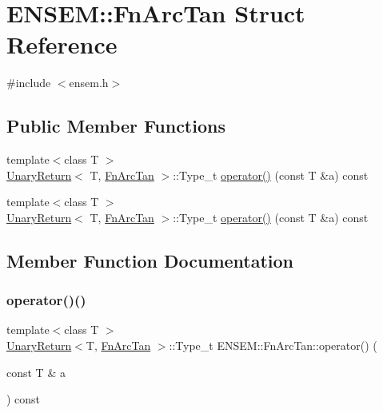 \hypertarget{structENSEM_1_1FnArcTan}{}\section{E\+N\+S\+EM\+:\+:Fn\+Arc\+Tan Struct Reference}
\label{structENSEM_1_1FnArcTan}


{\ttfamily \#include $<$ensem.\+h$>$}

\subsection*{Public Member Functions}
\begin{DoxyCompactItemize}
\item 
{\footnotesize template$<$class T $>$ }\\\mbox{\hyperlink{structENSEM_1_1UnaryReturn}{Unary\+Return}}$<$ T, \mbox{\hyperlink{structENSEM_1_1FnArcTan}{Fn\+Arc\+Tan}} $>$\+::Type\+\_\+t \mbox{\hyperlink{structENSEM_1_1FnArcTan_afb87d30d5f337130faf32e6af2c2669f}{operator()}} (const T \&a) const
\item 
{\footnotesize template$<$class T $>$ }\\\mbox{\hyperlink{structENSEM_1_1UnaryReturn}{Unary\+Return}}$<$ T, \mbox{\hyperlink{structENSEM_1_1FnArcTan}{Fn\+Arc\+Tan}} $>$\+::Type\+\_\+t \mbox{\hyperlink{structENSEM_1_1FnArcTan_afb87d30d5f337130faf32e6af2c2669f}{operator()}} (const T \&a) const
\end{DoxyCompactItemize}


\subsection{Member Function Documentation}
\mbox{\label{structENSEM_1_1FnArcTan_afb87d30d5f337130faf32e6af2c2669f}} 
\subsubsection{\texorpdfstring{operator()()}{operator()()}\hspace{0.1cm}{\footnotesize\ttfamily [1/2]}}
{\footnotesize\ttfamily template$<$class T $>$ \\
\mbox{\hyperlink{structENSEM_1_1UnaryReturn}{Unary\+Return}}$<$T, \mbox{\hyperlink{structENSEM_1_1FnArcTan}{Fn\+Arc\+Tan}} $>$\+::Type\+\_\+t E\+N\+S\+E\+M\+::\+Fn\+Arc\+Tan\+::operator() (\begin{DoxyParamCaption}\item[{const T \&}]{a }\end{DoxyParamCaption}) const\hspace{0.3cm}{\ttfamily [inline]}}

